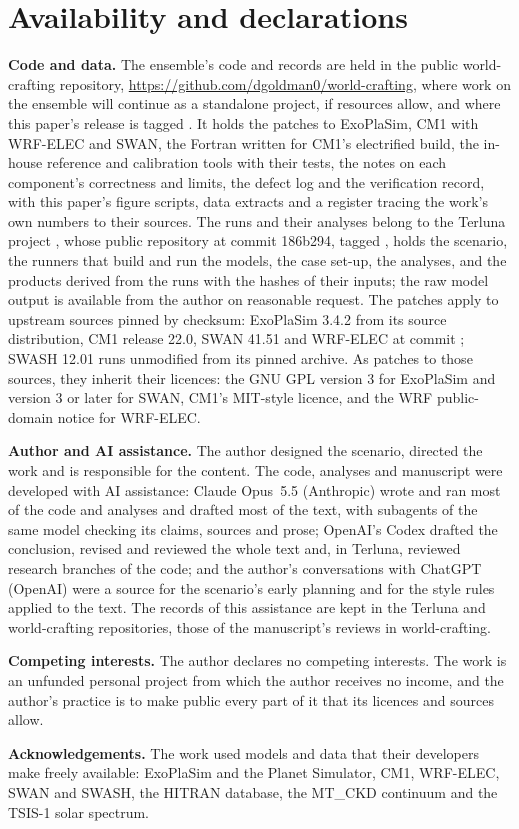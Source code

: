 \section{Availability and declarations}

\textbf{Code and data.} The ensemble's code and records are held in the public world-crafting repository,
\url{https://github.com/dgoldman0/world-crafting}, where work on the ensemble will continue as a standalone
project, if resources allow, and where this paper's release is tagged . It holds the patches to
ExoPlaSim, CM1 with WRF-ELEC and SWAN, the Fortran written for CM1's electrified build, the in-house reference and
calibration tools with their tests, the notes on each component's correctness and limits, the defect log and the
verification record, with this paper's figure scripts, data extracts and a register tracing the work's own numbers
to their sources. The runs and their analyses belong to the Terluna project \autocite{goldman2026terluna}, whose public repository at commit 186b294, tagged , holds the scenario, the runners that build and run the models, the case
set-up, the analyses, and the products derived from the runs with the hashes of their inputs; the raw model output
is available from the author on reasonable request. The patches apply to upstream sources pinned by checksum:
ExoPlaSim 3.4.2 from its source distribution, CM1 release 22.0, SWAN 41.51 and WRF-ELEC at commit ;
SWASH 12.01 runs unmodified from its pinned archive. As patches to those sources, they inherit their licences: the GNU GPL version 3 for ExoPlaSim and version 3 or later for SWAN, CM1's MIT-style
licence, and the WRF public-domain notice for WRF-ELEC.

\textbf{Author and AI assistance.} The author designed the scenario, directed the work and is responsible
for the content. The code, analyses and manuscript were developed with AI assistance: Claude Opus~5.5 (Anthropic)
wrote and ran most of the code and analyses and drafted most of the text, with subagents of the same
model checking its claims, sources and prose; OpenAI's Codex drafted the conclusion, revised and reviewed the whole
text and, in Terluna, reviewed research branches of the code; and the author's conversations with ChatGPT (OpenAI) were a source for the scenario's early planning and for the style rules applied to the text. The records of this assistance
are kept in the Terluna and world-crafting repositories, those of the manuscript's reviews in world-crafting.

\textbf{Competing interests.} The author declares no competing interests. The work is an unfunded personal project from which the author receives no income, and the author's practice is to make public every part of it that its
licences and sources allow.

\textbf{Acknowledgements.} The work used models and data that their developers make freely available: ExoPlaSim
and the Planet Simulator, CM1, WRF-ELEC, SWAN and SWASH, the HITRAN database, the MT\_CKD continuum and the
TSIS-1 solar spectrum.
